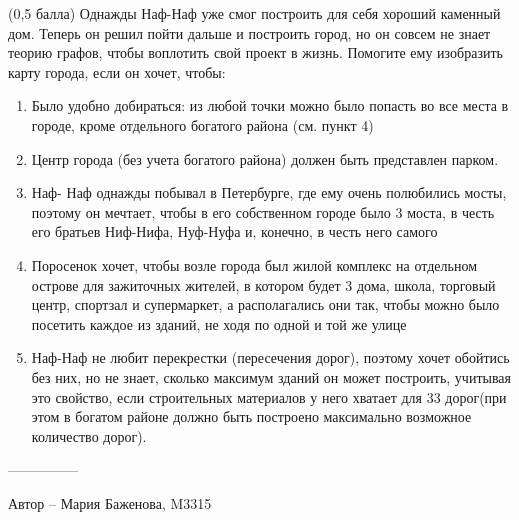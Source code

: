 \question
(0,5 балла) Однажды Наф-Наф уже смог построить для себя хороший каменный дом. Теперь он решил пойти дальше и построить город, но он совсем не знает теорию графов, чтобы воплотить свой проект в жизнь. Помогите ему изобразить карту города, если он хочет, чтобы:

\begin{enumerate}
\item Было удобно добираться: из любой точки можно было попасть во все места в городе, кроме отдельного богатого района (см. пункт 4)
\item Центр города (без учета богатого района) должен быть представлен парком.
\item Наф- Наф однажды побывал в Петербурге, где ему очень полюбились мосты, поэтому он мечтает, чтобы в его собственном городе было 3 моста, в честь его братьев Ниф-Нифа, Нуф-Нуфа и, конечно, в честь него самого
\item Поросенок хочет, чтобы возле города был жилой комплекс на отдельном острове для зажиточных жителей, в котором будет 3 дома, школа, торговый центр, спортзал и супермаркет, а располагались они так, чтобы можно было посетить каждое из зданий, не ходя по одной и той же улице
\item Наф-Наф не любит перекрестки (пересечения дорог), поэтому хочет обойтись без них, но не знает, сколько максимум зданий он может построить, учитывая это свойство, если строительных материалов у него хватает для 33 дорог(при этом в богатом районе должно быть построено максимально возможное количество дорог).
\end{enumerate}

---------------

Автор -- Мария Баженова, M3315
